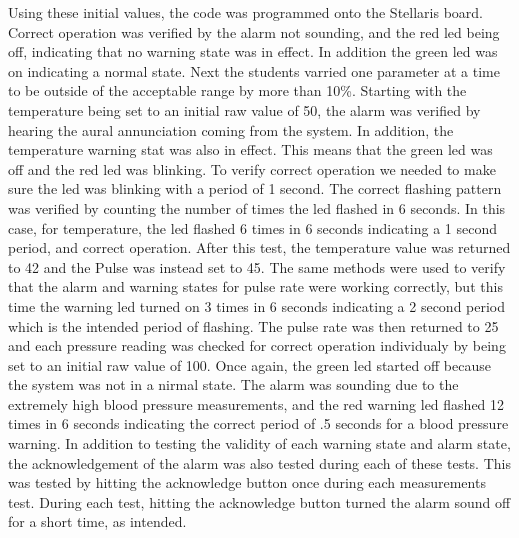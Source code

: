 \documentclass[12pt]{article} %
\begin{document}
Using these initial values, the code was programmed onto the Stellaris board. Correct operation was verified by the alarm not sounding, and the red led being off, indicating that no warning state was in effect. In addition the green led was on indicating a normal state. Next the students varried one parameter at a time to be outside of the acceptable range by more than 10\%. Starting with the temperature being set to an initial raw value of 50, the alarm was verified by hearing the aural annunciation coming from the system. In addition, the temperature warning stat was also in effect. This means that the green led was off and the red led was blinking. To verify correct operation we needed to make sure the led was blinking with a period of 1 second. The correct flashing pattern was verified by counting the number of times the led flashed in 6 seconds. In this case, for temperature, the led flashed 6 times in 6 seconds indicating a 1 second period, and correct operation. After this test, the temperature value was returned to 42 and the Pulse was instead set to 45. The same methods were used to verify that the alarm and warning states for pulse rate were working correctly, but this time the warning led turned on 3 times in 6 seconds indicating a 2 second period which is the intended period of flashing. The pulse rate was then returned to 25 and each pressure reading was checked for correct operation individualy by being set to an initial raw value of 100. Once again, the green led started off because the system was not in a nirmal state. The alarm was sounding due to the extremely high blood pressure measurements, and the red warning led flashed 12 times in 6 seconds indicating the correct period of .5 seconds for a blood pressure warning. In addition to testing the validity of each warning state and alarm state, the acknowledgement of the alarm was also tested during each of these tests. This was tested by hitting the acknowledge button once during each measurements test. During each test, hitting the acknowledge button turned the alarm sound off for a short time, as intended. 
\end{document}
